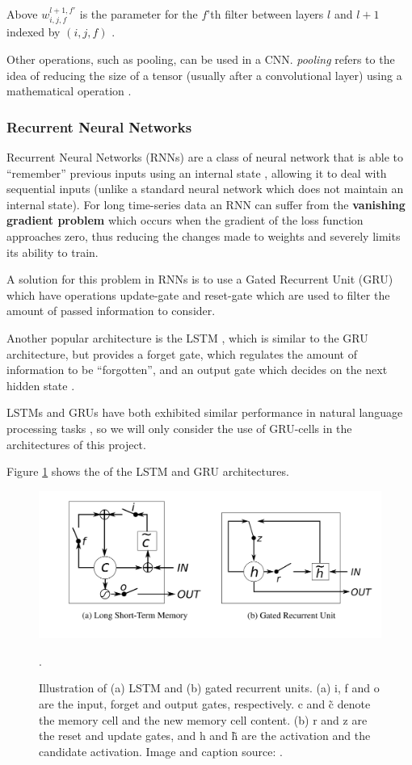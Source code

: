  Above $w^{l+1,f'}_{i,j,f}$ is the parameter for the $f$'th filter between layers $l$ and $l+1$ indexed by $(i,j,f)$ \cite{csmlnotes}.
 
 
 
Other operations, such as pooling, can be used in a CNN. \textit{pooling} refers to the idea of reducing the size of a tensor (usually after a convolutional layer) using a mathematical operation \cite{cnn}.

\subsubsection{Recurrent Neural Networks}
Recurrent Neural Networks (RNNs) are a class of neural network that is able to ``remember'' previous inputs using an internal state \cite{rnn}, allowing it to deal with sequential inputs (unlike a standard neural network which does not maintain an internal state). For long time-series data an RNN can suffer from the \textbf{vanishing gradient problem} \cite{rnn} which occurs when the gradient of the loss function approaches zero, thus reducing the changes made to weights and severely limits its ability to train. 

A solution for this problem in RNNs is to use a Gated Recurrent Unit (GRU) \cite{gru} which have operations update-gate and reset-gate which are used to filter the amount of passed information to consider. 

Another popular architecture is the LSTM \cite{lstm}, which is similar to the GRU architecture, but provides a forget gate, which regulates the amount of information to be ``forgotten'', and an output gate which decides on the next hidden state \cite{lstm}.

LSTMs and GRUs have both exhibited similar performance in natural language processing tasks \cite{lstmvsgru}, so we will only consider the use of GRU-cells in the architectures of this project.

Figure \ref{fig:rnn} shows the of the LSTM and GRU architectures.

\begin{figure}
    \centering
    \includegraphics[scale = 0.2]{images/rnn.png}
    \caption{Illustration of (a) LSTM and (b) gated recurrent units. (a) i, f and o are the input, forget and output gates, respectively. c and \~c denote the memory cell and the new memory cell content. (b) r and z are the reset and update gates, and h and \~h are the activation and the candidate activation. Image and caption source: \cite{rnn}.}.
    \label{fig:rnn}
\end{figure}

